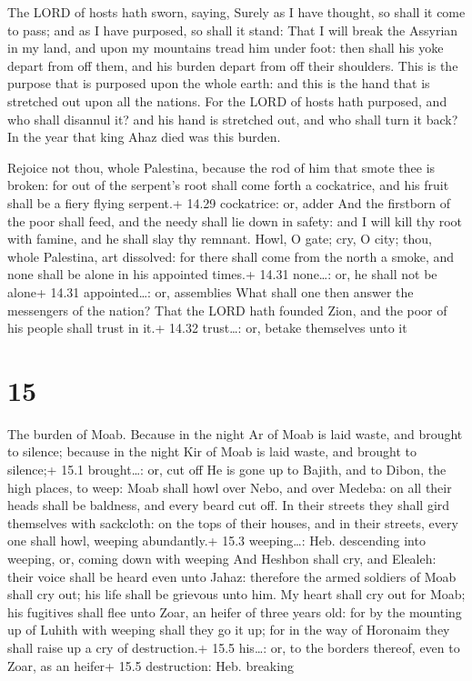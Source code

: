  The LORD of hosts hath sworn, saying, Surely as I have
thought, so shall it come to pass; and as I have purposed, so shall it
stand:  That I will break the Assyrian in my land, and upon
my mountains tread him under foot: then shall his yoke depart from off
them, and his burden depart from off their shoulders.  This
is the purpose that is purposed upon the whole earth: and this is the
hand that is stretched out upon all the nations.  For the
LORD of hosts hath purposed, and who shall disannul it? and his hand is
stretched out, and who shall turn it back?  In the year
that king Ahaz died was this burden.

 Rejoice not thou, whole Palestina, because the rod of
him that smote thee is broken: for out of the serpent's root shall come
forth a cockatrice, and his fruit shall be a fiery flying serpent.+
14.29 cockatrice: or, adder  And the firstborn of the poor
shall feed, and the needy shall lie down in safety: and I will kill thy
root with famine, and he shall slay thy remnant.  Howl, O
gate; cry, O city; thou, whole Palestina, art dissolved: for there shall
come from the north a smoke, and none shall be alone in his appointed
times.+ 14.31 none\ldots: or, he shall not be alone+ 14.31
appointed\ldots: or, assemblies  What shall one then answer
the messengers of the nation? That the LORD hath founded Zion, and the
poor of his people shall trust in it.+ 14.32 trust\ldots: or, betake
themselves unto it

\hypertarget{section-14}{%
\section{15}\label{section-14}}

 The burden of Moab. Because in the night Ar of Moab is laid
waste, and brought to silence; because in the night Kir of Moab is laid
waste, and brought to silence;+ 15.1 brought\ldots: or, cut off
 He is gone up to Bajith, and to Dibon, the high places, to
weep: Moab shall howl over Nebo, and over Medeba: on all their heads
shall be baldness, and every beard cut off.  In their
streets they shall gird themselves with sackcloth: on the tops of their
houses, and in their streets, every one shall howl, weeping abundantly.+
15.3 weeping\ldots: Heb. descending into weeping, or, coming down with
weeping  And Heshbon shall cry, and Elealeh: their voice
shall be heard even unto Jahaz: therefore the armed soldiers of Moab
shall cry out; his life shall be grievous unto him.  My
heart shall cry out for Moab; his fugitives shall flee unto Zoar, an
heifer of three years old: for by the mounting up of Luhith with weeping
shall they go it up; for in the way of Horonaim they shall raise up a
cry of destruction.+ 15.5 his\ldots: or, to the borders thereof, even to
Zoar, as an heifer+ 15.5 destruction: Heb. breaking


